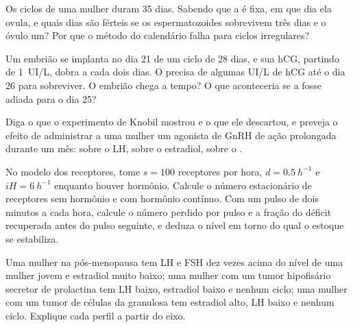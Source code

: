 \begin{exercise}[$\star\star$]\label{exo:b2:reproductive-hormones:7}
Os ciclos de uma mulher duram 35 dias. Sabendo que a  é
fixa, em que dia ela ovula, e quais dias são férteis se os
espermatozoides sobrevivem três dias e o óvulo um? Por que o método do
calendário falha para ciclos irregulares?
\end{exercise}

\begin{exercise}[$\star\star$]\label{exo:b2:reproductive-hormones:8}
Um embrião se implanta no dia 21 de um ciclo de 28 dias, e sua hCG,
partindo de \qty{1}{UI/L}, dobra a cada dois dias. O 
precisa de algumas UI/L de hCG até o dia 26 para sobreviver. O embrião
chega a tempo? O que aconteceria se a  fosse adiada para o
dia 25?
\end{exercise}

\begin{exercise}[$\star\star$]\label{exo:b2:reproductive-hormones:9}
Diga o que o experimento de Knobil mostrou e o que ele descartou, e
preveja o efeito de administrar a uma mulher um agonista de GnRH de
ação prolongada durante um mês: sobre o LH, sobre o estradiol, sobre o
.
\end{exercise}

\begin{exercise}[$\star\star\star$]\label{exo:b2:reproductive-hormones:10}
No modelo dos receptores, tome $s = 100$ receptores por hora, $d =
\qty{0.5}{h^{-1}}$ e $iH = \qty{6}{h^{-1}}$ enquanto houver hormônio.
Calcule o número estacionário de receptores sem hormônio e com hormônio
contínuo. Com um pulso de dois minutos a cada hora, calcule o número
perdido por pulso e a fração do déficit recuperada antes do pulso
seguinte, e deduza o nível em torno do qual o estoque se estabiliza.
\end{exercise}

\begin{exercise}[$\star\star\star$]\label{exo:b2:reproductive-hormones:11}
Uma mulher na pós-menopausa tem LH e FSH dez vezes acima do nível de
uma mulher jovem e estradiol muito baixo; uma mulher com um tumor
hipofisário secretor de prolactina tem LH baixo, estradiol baixo e
nenhum ciclo; uma mulher com um tumor de células da granulosa tem
estradiol alto, LH baixo e nenhum ciclo. Explique cada perfil a partir
do eixo.
\end{exercise}

